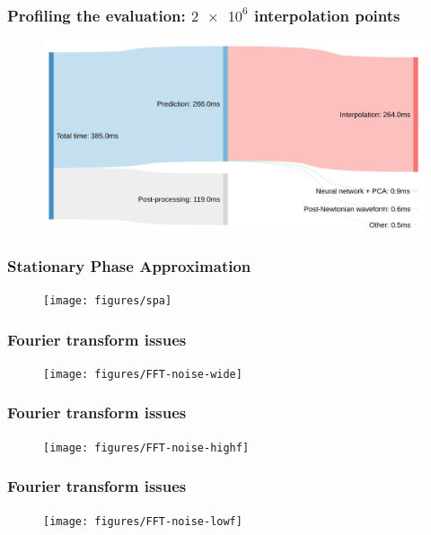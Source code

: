 \documentclass{beamer}
\begin{document}
\begin{frame}
    \frametitle{Profiling the evaluation: \(\num{2e6}\) interpolation points}
    \begin{figure}[ht]
    \centering
    \includegraphics[width=\textwidth]{figures/sankey_full}
    \label{fig:sankey_full}
    \end{figure}
\end{frame}

\begin{frame}
    \frametitle{Stationary Phase Approximation}
    \begin{figure}[ht]
    \centering
    \texttt{[image: figures/spa]}
    \label{fig:spa}
    \end{figure}
\end{frame}

\begin{frame}
    \frametitle{Fourier transform issues}
    
    \begin{figure}[ht]
    \centering
    \texttt{[image: figures/FFT-noise-wide]}
    \label{fig:fft-noise-wide}
    \end{figure}
\end{frame}

\begin{frame}
    \frametitle{Fourier transform issues}
    \begin{figure}[ht]
    \centering
    \texttt{[image: figures/FFT-noise-highf]}
    \label{fig:fft-noise-highf}
    \end{figure}
\end{frame}

\begin{frame}
    \frametitle{Fourier transform issues}
    \begin{figure}[ht]
    \centering
    \texttt{[image: figures/FFT-noise-lowf]}
    \label{fig:fft-noise-lowf}
    \end{figure}
\end{frame}
\end{document}

